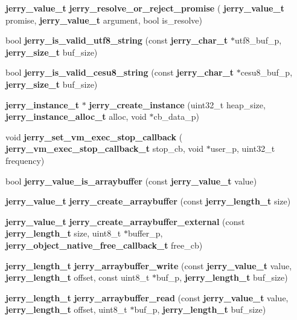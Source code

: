 \begin{DoxyCompactItemize}
\item 
\textbf{ jerry\+\_\+value\+\_\+t} \textbf{ jerry\+\_\+resolve\+\_\+or\+\_\+reject\+\_\+promise} (\textbf{ jerry\+\_\+value\+\_\+t} promise, \textbf{ jerry\+\_\+value\+\_\+t} argument, bool is\+\_\+resolve)
\item 
bool \textbf{ jerry\+\_\+is\+\_\+valid\+\_\+utf8\+\_\+string} (const \textbf{ jerry\+\_\+char\+\_\+t} $\ast$utf8\+\_\+buf\+\_\+p, \textbf{ jerry\+\_\+size\+\_\+t} buf\+\_\+size)
\item 
\mbox{\label{group___core_ga3aa247abc07d91f0e479508e6091bbbd}} 
bool {\bfseries jerry\+\_\+is\+\_\+valid\+\_\+cesu8\+\_\+string} (const \textbf{ jerry\+\_\+char\+\_\+t} $\ast$cesu8\+\_\+buf\+\_\+p, \textbf{ jerry\+\_\+size\+\_\+t} buf\+\_\+size)
\item 
\mbox{\label{group___core_gaed5c53d2dad14e5325918e8450d903eb}} 
\textbf{ jerry\+\_\+instance\+\_\+t} $\ast$ {\bfseries jerry\+\_\+create\+\_\+instance} (uint32\+\_\+t heap\+\_\+size, \textbf{ jerry\+\_\+instance\+\_\+alloc\+\_\+t} alloc, void $\ast$cb\+\_\+data\+\_\+p)
\item 
void \textbf{ jerry\+\_\+set\+\_\+vm\+\_\+exec\+\_\+stop\+\_\+callback} (\textbf{ jerry\+\_\+vm\+\_\+exec\+\_\+stop\+\_\+callback\+\_\+t} stop\+\_\+cb, void $\ast$user\+\_\+p, uint32\+\_\+t frequency)
\item 
bool \textbf{ jerry\+\_\+value\+\_\+is\+\_\+arraybuffer} (const \textbf{ jerry\+\_\+value\+\_\+t} value)
\item 
\mbox{\label{group___core_gaeb6adb06cac4b1336840f4eef47e6190}} 
\textbf{ jerry\+\_\+value\+\_\+t} {\bfseries jerry\+\_\+create\+\_\+arraybuffer} (const \textbf{ jerry\+\_\+length\+\_\+t} size)
\item 
\mbox{\label{group___core_gaecf0605e928b4320e311244bfcac3f80}} 
\textbf{ jerry\+\_\+value\+\_\+t} {\bfseries jerry\+\_\+create\+\_\+arraybuffer\+\_\+external} (const \textbf{ jerry\+\_\+length\+\_\+t} size, uint8\+\_\+t $\ast$buffer\+\_\+p, \textbf{ jerry\+\_\+object\+\_\+native\+\_\+free\+\_\+callback\+\_\+t} free\+\_\+cb)
\item 
\mbox{\label{group___core_ga738d05337a1bb64de00bb6101032b935}} 
\textbf{ jerry\+\_\+length\+\_\+t} {\bfseries jerry\+\_\+arraybuffer\+\_\+write} (const \textbf{ jerry\+\_\+value\+\_\+t} value, \textbf{ jerry\+\_\+length\+\_\+t} offset, const uint8\+\_\+t $\ast$buf\+\_\+p, \textbf{ jerry\+\_\+length\+\_\+t} buf\+\_\+size)
\item 
\mbox{\label{group___core_gafc7654cf08a8646a7a1284ec03c4fd21}} 
\textbf{ jerry\+\_\+length\+\_\+t} {\bfseries jerry\+\_\+arraybuffer\+\_\+read} (const \textbf{ jerry\+\_\+value\+\_\+t} value, \textbf{ jerry\+\_\+length\+\_\+t} offset, uint8\+\_\+t $\ast$buf\+\_\+p, \textbf{ jerry\+\_\+length\+\_\+t} buf\+\_\+size)

\end{DoxyCompactItemize}
